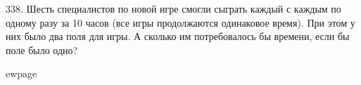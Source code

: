 338. Шесть специалистов по новой игре смогли сыграть каждый с каждым по одному разу за 10 часов (все игры продолжаются одинаковое время). При этом у них было два поля для игры. А сколько им потребовалось бы времени, если бы поле было одно?

ewpage
